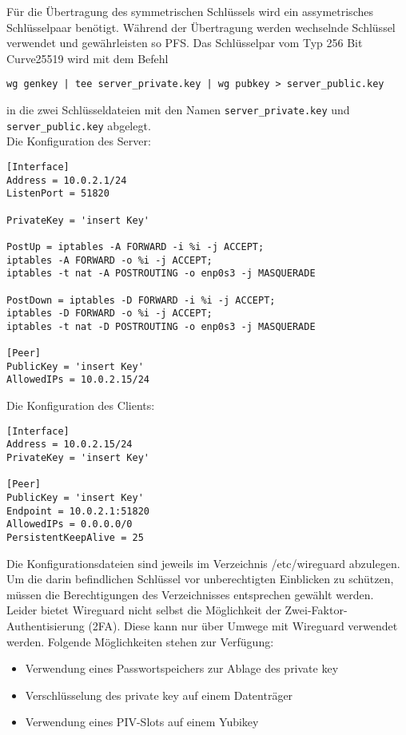 \noindent F\"ur die \"Ubertragung des symmetrischen Schl\"ussels wird ein assymetrisches Schl\"usselpaar ben\"otigt. W\"ahrend der \"Ubertragung werden wechselnde Schl\"ussel verwendet und gew\"ahrleisten so \ac{PFS}. Das Schl\"usselpar vom Typ 256 Bit Curve25519 wird mit dem Befehl 
\begin{verbatim}
wg genkey | tee server_private.key | wg pubkey > server_public.key
\end{verbatim}
in die zwei Schl\"usseldateien mit den Namen \verb+server_private.key+ und \verb+server_public.key+ abgelegt.\\
\newpage
\noindent Die Konfiguration des Server:
\begin{verbatim}
[Interface]
Address = 10.0.2.1/24
ListenPort = 51820

PrivateKey = 'insert Key'

PostUp = iptables -A FORWARD -i %i -j ACCEPT; 
iptables -A FORWARD -o %i -j ACCEPT; 
iptables -t nat -A POSTROUTING -o enp0s3 -j MASQUERADE

PostDown = iptables -D FORWARD -i %i -j ACCEPT; 
iptables -D FORWARD -o %i -j ACCEPT; 
iptables -t nat -D POSTROUTING -o enp0s3 -j MASQUERADE

[Peer]  
PublicKey = 'insert Key'
AllowedIPs = 10.0.2.15/24
\end{verbatim}
\vspace{0.5cm}
\noindent Die Konfiguration des Clients:
\begin{verbatim}
[Interface]
Address = 10.0.2.15/24
PrivateKey = 'insert Key'

[Peer]  
PublicKey = 'insert Key'
Endpoint = 10.0.2.1:51820
AllowedIPs = 0.0.0.0/0
PersistentKeepAlive = 25
\end{verbatim}

\newpage
\noindent Die Konfigurationsdateien sind jeweils im Verzeichnis /etc/wireguard abzulegen. Um die darin befindlichen Schl\"ussel vor unberechtigten Einblicken zu sch\"utzen, m\"ussen die Berechtigungen des Verzeichnisses entsprechen gew\"ahlt werden. \\

\noindent Leider bietet Wireguard nicht selbst die M\"oglichkeit der Zwei-Faktor-Authentisierung (2FA). Diese kann nur \"uber Umwege mit Wireguard verwendet werden. Folgende M\"oglichkeiten stehen zur Verf\"ugung:
   \begin{itemize}
      \item Verwendung eines Passwortspeichers zur Ablage des private key
      \item Verschl\"usselung des private key auf einem Datentr\"ager
			\item Verwendung eines PIV-Slots auf einem Yubikey
   \end{itemize}

